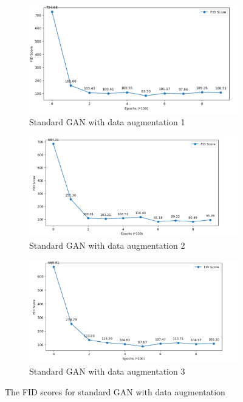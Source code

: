 \begin{figure}[H]
    \centering
    \begin{subfigure}[b]{\linewidth}
        \centering
        \includegraphics[width=0.84\linewidth]{./Images/standard_GAN_with_data_augementation1.jpg}
        \caption{Standard GAN with data augmentation 1}
        \label{fig:Dense}
    \end{subfigure}
    \vspace{0.05\linewidth} 
    \begin{subfigure}[b]{\linewidth}
        \centering
        \includegraphics[width=0.8\linewidth]{./Images/standard_GAN_with_data_augementation2.jpg}
        \caption{Standard GAN with data augmentation 2}
        \label{fig:Conv2DTranspose}
    \end{subfigure}
    \begin{subfigure}[b]{\linewidth}
        \centering
        \includegraphics[width=0.8\linewidth]{./Images/standard_GAN_with_data_augementation3.jpg}
        \caption{Standard GAN with data augmentation 3}
        \label{fig:Conv2DTranspose}
    \end{subfigure}
    \caption{The FID scores for standard GAN with data augmentation}
    \label{fig:combined}
\end{figure}

